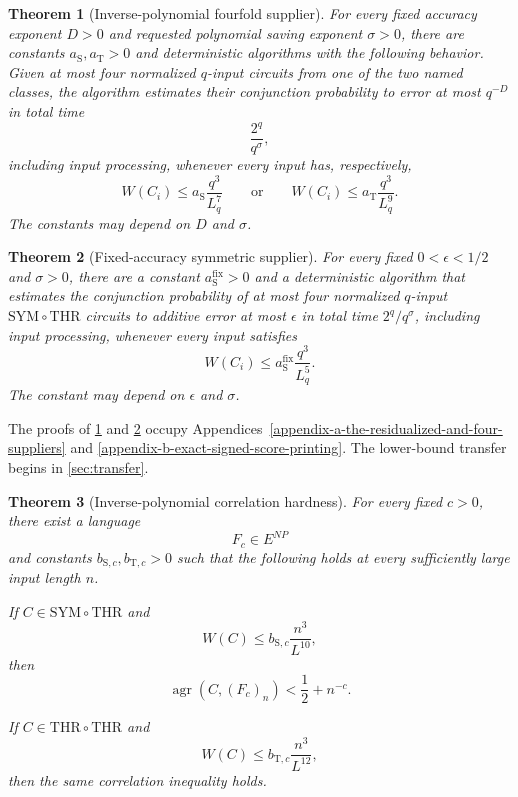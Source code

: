 \documentclass[11pt,letterpaper]{article}
\newcommand{\cref}[1]{\ref{#1}}
\newtheorem{theorem}{Theorem}[section]
\theoremstyle{definition}
\theoremstyle{remark}
\newcommand{\SYMTHR}{\mathrm{SYM}\circ\mathrm{THR}}
\begin{document}
\begin{theorem}[Inverse-polynomial fourfold supplier]
\label{thm:supplier-inverse}
For every fixed accuracy exponent \(D>0\) and requested polynomial saving
exponent \(\sigma>0\), there are constants
\(a_{\mathrm S},a_{\mathrm T}>0\) and deterministic algorithms with the
following behavior. Given at most four normalized \(q\)-input circuits from
one of the two named classes, the algorithm estimates their conjunction
probability to error at most \(q^{-D}\) in total time
\[
\frac{2^q}{q^\sigma},
\]
including input processing, whenever every input has, respectively,
\[
W(C_i)\le a_{\mathrm S}\frac{q^3}{L_q^7}
\qquad\text{or}\qquad
W(C_i)\le a_{\mathrm T}\frac{q^3}{L_q^9}.
\]
The constants may depend on \(D\) and \(\sigma\).
\end{theorem}

\begin{theorem}[Fixed-accuracy symmetric supplier]
\label{thm:supplier-fixed}
For every fixed \(0<\epsilon<1/2\) and \(\sigma>0\), there are a constant
\(a_{\mathrm S}^{\mathrm{fix}}>0\) and a deterministic algorithm that
estimates the conjunction probability of at most four normalized
\(q\)-input \(\SYMTHR\) circuits to additive error at most \(\epsilon\) in
total time \(2^q/q^\sigma\), including input processing, whenever every
input satisfies
\[
W(C_i)\le a_{\mathrm S}^{\mathrm{fix}}\frac{q^3}{L_q^5}.
\]
The constant may depend on \(\epsilon\) and \(\sigma\).
\end{theorem}

The proofs of \cref{thm:supplier-inverse} and \cref{thm:supplier-fixed} occupy
Appendices~\ref{appendix-a-the-residualized-and-four-suppliers} and
\ref{appendix-b-exact-signed-score-printing}. The lower-bound transfer begins
in \cref{sec:transfer}.

\begin{theorem}[Inverse-polynomial correlation hardness]
\label{thm:main-inverse}
For every fixed \(c>0\), there exist a language \[
F_c\in E^{NP}
\] and constants \(b_{\mathrm S,c},b_{\mathrm T,c}>0\) such that the
following holds at every sufficiently large input length \(n\).

If \(C\in\mathrm{SYM}\circ\mathrm{THR}\) and \[
W(C)\le b_{\mathrm S,c}\frac{n^3}{L^{10}},
\] then \[
\operatorname{agr}(C,(F_c)_n)<\frac12+n^{-c}.
\]

If \(C\in\mathrm{THR}\circ\mathrm{THR}\) and \[
W(C)\le b_{\mathrm T,c}\frac{n^3}{L^{12}},
\] then the same correlation inequality holds.
\end{theorem}
\end{document}
